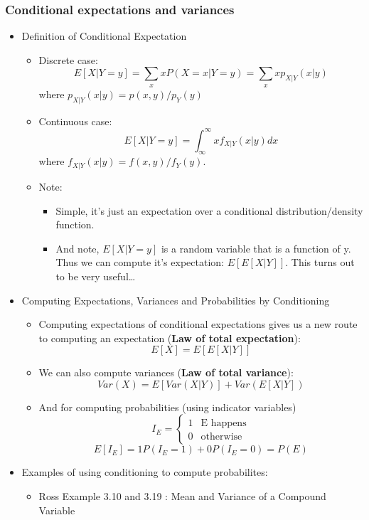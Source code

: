 \documentclass[10pt,containsverbatim,paralist]{article}
\begin{document}
\subsubsection*{Conditional expectations and variances}
\label{sec-1-1-7}
\begin{itemize}
\item Definition of Conditional Expectation
\label{sec-1-1-7-1}
\begin{itemize}
\item Discrete case:
\label{sec-1-1-7-1-1}
$$E[X|Y=y] = \sum_x x P(X=x|Y=y) = \sum_x x p_{X|Y}(x|y)$$
where $p_{X|Y}(x|y) = p(x,y)/p_Y(y)$
\item Continuous case:
\label{sec-1-1-7-1-2}
$$E[X|Y=y] = \int_{\infty}^{\infty} x f_{X|Y}(x|y)dx $$
where $f_{X|Y}(x|y) = f(x,y)/f_Y(y)$.
\item Note:
\label{sec-1-1-7-1-3}
\begin{itemize}
\item Simple, it's just an expectation over a conditional distribution/density function.
\item And note, $E[X|Y=y]$ is a random variable that is a function of y.  Thus we can
compute it's expectation:  $E[E[X|Y]]$. This turns out to be very useful\ldots{}
\end{itemize}
\end{itemize}
\item Computing Expectations, Variances and Probabilities by Conditioning
\label{sec-1-1-7-2}
\begin{itemize}
\item Computing expectations of conditional expectations gives us a new route to computing an expectation 
(\textbf{Law of total expectation}): 
$$E[X]= E[E[X|Y]]$$
\label{sec-1-1-7-2-1}
\item We can also compute variances (\textbf{Law of total variance}): $$Var(X)=E[Var(X|Y)]+Var(E[X|Y])$$
\label{sec-1-1-7-2-2}
\item And for computing probabilities (using indicator variables)
$$
I_E=
\begin{cases}
1 & \text{E happens}\\
0 & \text{otherwise}
\end{cases}
$$
$$
E[I_E]=1P(I_E=1) + 0P(I_E=0)=P(E)
$$
\label{sec-1-1-7-2-3}
\end{itemize}
\item Examples of using conditioning to compute probabilites:
\label{sec-1-1-7-3}
\begin{itemize}
\item Ross Example 3.10 and 3.19 : Mean and Variance of a Compound Variable

\end{itemize}
\end{itemize}
\end{document}
